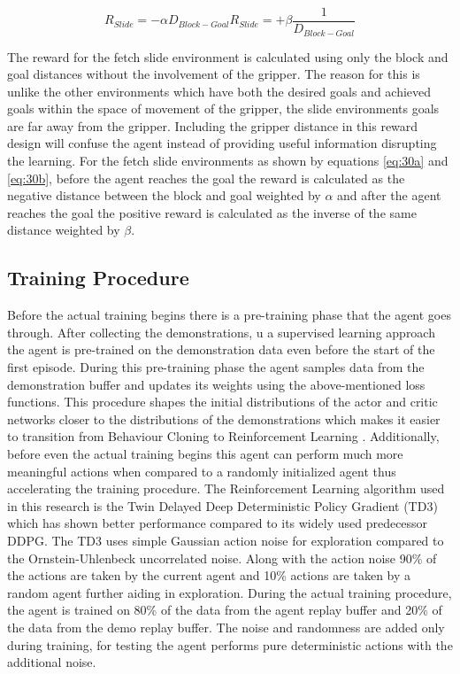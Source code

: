 \begin{subequations}
\begin{equation}\label{eq:30a}
    R_{Slide} = -\alpha D_{Block-Goal}
\end{equation}   
\begin{equation}\label{eq:30b}
    R_{Slide} = +\beta \frac{1}{D_{Block-Goal}}
\end{equation}
\end{subequations}

The reward for the fetch slide environment is calculated using only the block and goal distances without the involvement of the gripper. The reason for this is unlike the other environments which have both the desired goals and achieved goals within the space of movement of the gripper, the slide environments goals are far away from the gripper. Including the gripper distance in this reward design will confuse the agent instead of providing useful information disrupting the learning. For the fetch slide environments as shown by equations \ref{eq:30a} and \ref{eq:30b}, before the agent reaches the goal the reward is calculated as the negative distance between the block and goal weighted by $\alpha$ and after the agent reaches the goal the positive reward is calculated as the inverse of the same distance weighted by $\beta$. \\

\subsection{Training Procedure}

Before the actual training begins there is a pre-training phase that the agent goes through. After collecting the demonstrations, u a supervised learning approach the agent is pre-trained on the demonstration data even before the start of the first episode. During this pre-training phase the agent samples data from the demonstration buffer and updates its weights using the above-mentioned loss functions. This procedure shapes the initial distributions of the actor and critic networks closer to the distributions of the demonstrations which makes it easier to transition from Behaviour Cloning to Reinforcement Learning \cite{goecks2020integrating}. Additionally, before even the actual training begins this agent can perform much more meaningful actions when compared to a randomly initialized agent thus accelerating the training procedure. The Reinforcement Learning algorithm used in this research is the Twin Delayed Deep Deterministic Policy Gradient (TD3) which has shown better performance compared to its widely used predecessor DDPG. The TD3 uses simple Gaussian action noise for exploration compared to the Ornstein-Uhlenbeck \cite{Finch04ornstein-uhlenbeckprocess} uncorrelated noise. Along with the action noise 90\% of the actions are taken by the current agent and 10\% actions are taken by a random agent further aiding in exploration. During the actual training procedure, the agent is trained on 80\% of the data from the agent replay buffer and 20\% of the data from the demo replay buffer. The noise and randomness are added only during training, for testing the agent performs pure deterministic actions with the additional noise. \\


